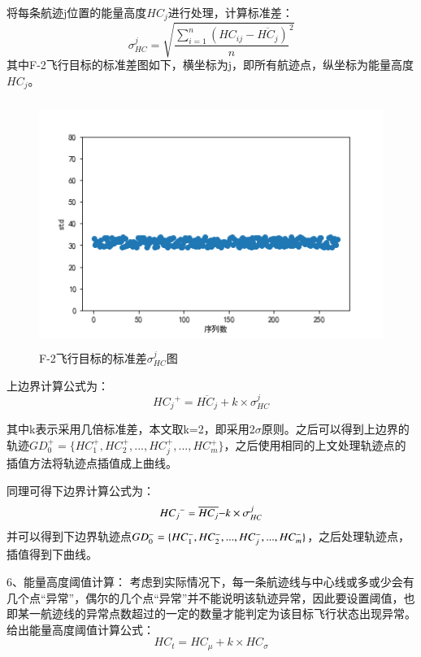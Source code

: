 \documentclass[GBK]{ctexart}
\begin{document}
\begin{spacing}{1.5}
将每条航迹j位置的能量高度$H{C_j}$进行处理，计算标准差：
\begin{equation}
\sigma _{HC}^j = \sqrt {{{\frac{{\sum\limits_{i = 1}^n {(H{C_{ij}} - \overline {H{C_j}} )} }}{n}}^2}}
\end{equation}
其中F-2飞行目标的标准差图如下，横坐标为j，即所有航迹点，纵坐标为能量高度$H{C_j}$。
\begin{figure}[H]
  \centering
  \includegraphics[width=15cm,height=8cm]{biaozhuncha}
  \caption{F-2飞行目标的标准差$\sigma _{HC}^j$图}\label{biaozhuncha}
\end{figure}
上边界计算公式为：
\begin{equation}
H{C_j}^ +  = \overline {H{C_j}}  + k \times \sigma _{HC}^j
\end{equation}

其中k表示采用几倍标准差，本文取k=2，即采用2$\sigma $原则。之后可以得到上边界的轨迹$GD_0^ +  = \{ HC_1^ + ,HC_2^ + ,...,HC_j^ + ,...,HC_m^ + \} $，之后使用相同的上文处理轨迹点的插值方法将轨迹点插值成上曲线。

同理可得下边界计算公式为：
\begin{equation}
H{C_j}^{\rm{ - }} = \overline {H{C_j}} {\rm{ - }}k \times \sigma _{HC}^j
\end{equation}
并可以得到下边界轨迹点$GD_0^{\rm{ - }} = \{ HC_1^{\rm{ - }},HC_2^{\rm{ - }},...,HC_j^{\rm{ - }},...,HC_m^{\rm{ - }}\} $，之后处理轨迹点，插值得到下曲线。

6、能量高度阈值计算：
考虑到实际情况下，每一条航迹线与中心线或多或少会有几个点“异常”，偶尔的几个点“异常”并不能说明该轨迹异常，因此要设置阈值，也即某一航迹线的异常点数超过的一定的数量才能判定为该目标飞行状态出现异常。
给出能量高度阈值计算公式：
\begin{equation}
H{C_t} = H{C_\mu } + k \times H{C_\sigma }
\end{equation}


\end{spacing}
\end{document}
